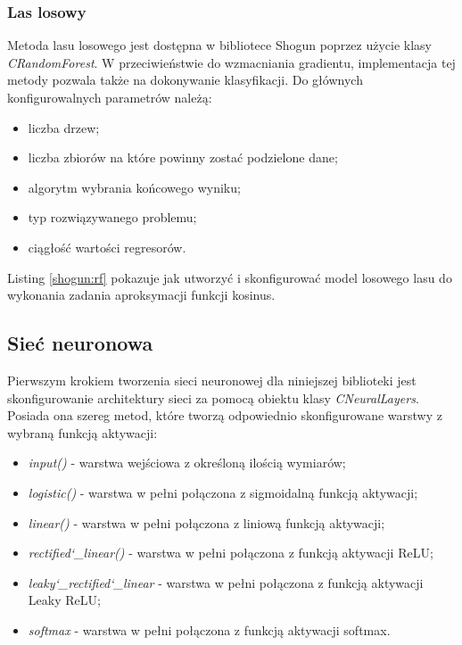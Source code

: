 \subsubsection{Las losowy}
Metoda lasu losowego jest dostępna w bibliotece Shogun poprzez użycie klasy \textit{CRandomForest}. W przeciwieństwie do wzmacniania gradientu, implementacja tej metody pozwala także na dokonywanie klasyfikacji. Do głównych konfigurowalnych parametrów należą:

\begin{itemize}
	\item liczba drzew;
	\item liczba zbiorów na które powinny zostać podzielone dane;
	\item algorytm wybrania końcowego wyniku;
	\item typ rozwiązywanego problemu;
	\item ciągłość wartości regresorów.
\end{itemize}

Listing \ref{shogun:rf} pokazuje jak utworzyć i skonfigurować model losowego lasu do wykonania zadania aproksymacji funkcji kosinus.


\subsection{Sieć neuronowa}

Pierwszym krokiem tworzenia sieci neuronowej dla niniejszej biblioteki jest skonfigurowanie architektury sieci za pomocą obiektu klasy \textit{CNeuralLayers}. Posiada ona szereg metod, które tworzą odpowiednio skonfigurowane warstwy z wybraną funkcją aktywacji:

\begin{itemize}
	\item \textit{input()} - warstwa wejściowa z określoną ilością wymiarów;
	\item \textit{logistic()} - warstwa w pełni połączona z sigmoidalną funkcją aktywacji;
	\item \textit{linear()} - warstwa w pełni połączona z liniową funkcją aktywacji;
	\item \textit{rectified\char`_linear()} - warstwa w pełni połączona z funkcją aktywacji ReLU;
	\item \textit{leaky\char`_rectified\char`_linear} - warstwa w pełni połączona z funkcją aktywacji Leaky ReLU;
	\item \textit{softmax} - warstwa w pełni połączona z funkcją aktywacji softmax. 
\end{itemize}


